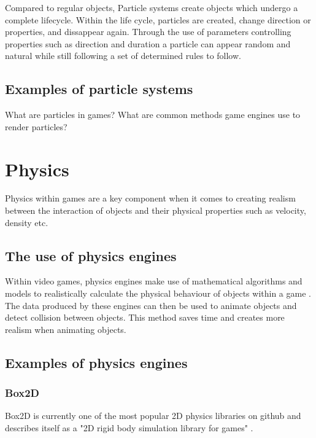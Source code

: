 \documentclass{article} %
\begin{document}
Compared to regular objects, Particle systems create objects which undergo a complete lifecycle. Within the life cycle, particles are created, change direction or properties, and dissappear again. Through the use of parameters controlling properties such as direction and duration a particle can appear random and natural while still following a set of determined rules to follow.

\subsection{Examples of particle systems}



What are particles in games?
What are common methods game engines use to render particles?

\newpage

\section{Physics}

Physics within games are a key component when it comes to creating realism between the interaction of objects and their physical properties such as velocity, density etc. 

\subsection{The use of physics engines}

Within video games, physics engines make use of mathematical algorithms and models to realistically calculate the physical behaviour of objects within a game \cite{Ipacs_2023}. The data produced by these engines can then be used to animate objects and detect collision between objects. This method saves time and creates more realism when animating objects.

\subsection{Examples of physics engines}

\subsubsection{Box2D}

Box2D is currently one of the most popular 2D physics libraries on github and describes itself as a "2D rigid body simulation library for games" \cite{Catto_2024}.
\end{document}
